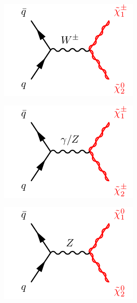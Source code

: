 \begin{figure}
	\centering
	\begin{subfigure}[b]{0.33\linewidth}
		\centering\includegraphics[width=.9\textwidth]{electroweakino_production_1}
		\caption{\label{fig:electroweakino_production_1}}
	\end{subfigure}%
	\begin{subfigure}[b]{0.33\linewidth}
		\centering\includegraphics[width=.9\textwidth]{electroweakino_production_2}
		\caption{\label{fig:electroweakino_production_2}}
	\end{subfigure}%
	\begin{subfigure}[b]{0.33\linewidth}
		\centering\includegraphics[width=.9\textwidth]{electroweakino_production_3}

\end{subfigure}
\end{figure}
